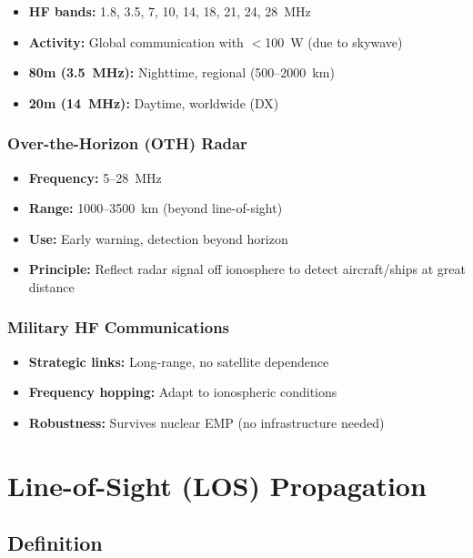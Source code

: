 \begin{itemize}
\item \textbf{HF bands:} 1.8, 3.5, 7, 10, 14, 18, 21, 24, 28~MHz
\item \textbf{Activity:} Global communication with $<$100~W (due to skywave)
\item \textbf{80m (3.5~MHz):} Nighttime, regional (500--2000~km)
\item \textbf{20m (14~MHz):} Daytime, worldwide (DX)
\end{itemize}

\subsubsection{Over-the-Horizon (OTH) Radar}

\begin{itemize}
\item \textbf{Frequency:} 5--28~MHz
\item \textbf{Range:} 1000--3500~km (beyond line-of-sight)
\item \textbf{Use:} Early warning, detection beyond horizon
\item \textbf{Principle:} Reflect radar signal off ionosphere to detect aircraft/ships at great distance
\end{itemize}

\subsubsection{Military HF Communications}

\begin{itemize}
\item \textbf{Strategic links:} Long-range, no satellite dependence
\item \textbf{Frequency hopping:} Adapt to ionospheric conditions
\item \textbf{Robustness:} Survives nuclear EMP (no infrastructure needed)
\end{itemize}

\section{Line-of-Sight (LOS) Propagation}
\label{sec:line-of-sight}

\subsection{Definition}

